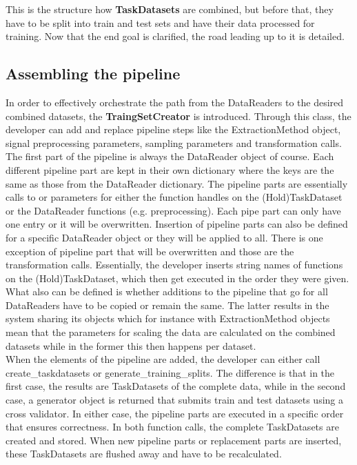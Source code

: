 This is the structure how \textbf{TaskDatasets} are combined, but before that, they have to be split into train and test sets and have their data processed for training. Now that the end goal is clarified, the road leading up to it is detailed. \\

\subsection{Assembling the pipeline} \label{Impl:DataLoad:Assembling}

In order to effectively orchestrate the path from the DataReaders to the desired combined datasets, the \textbf{TraingSetCreator} is introduced. Through this class, the developer can add and replace pipeline steps like the ExtractionMethod object, signal preprocessing parameters, sampling parameters and transformation calls. The first part of the pipeline is always the DataReader object of course. Each different pipeline part are kept in their own dictionary where the keys are the same as those from the DataReader dictionary. The pipeline parts are essentially calls to or parameters for either the function handles on the (Hold)TaskDataset or the DataReader functions (e.g. preprocessing). Each pipe part can only have one entry or it will be overwritten. Insertion of pipeline parts can also be defined for a specific DataReader object or they will be applied to all. There is one exception of pipeline part that will be overwritten and those are the transformation calls. Essentially, the developer inserts string names of functions on the (Hold)TaskDataset, which then get executed in the order they were given. What also can be defined is whether additions to the pipeline that go for all DataReaders have to be copied or remain the same. The latter results in the system sharing its objects which for instance with ExtractionMethod objects mean that the parameters for scaling the data are calculated on the combined datasets while in the former this then happens per dataset.\\

When the elements of the pipeline are added, the developer can either call create\_taskdatasets or generate\_training\_splits. The difference is that in the first case, the results are TaskDatasets of the complete data, while in the second case, a generator object is returned that submits train and test datasets using a cross validator. In either case, the pipeline parts are executed in a specific order that ensures correctness. In both function calls, the complete TaskDatasets are created and stored. When new pipeline parts or replacement parts are inserted, these TaskDatasets are flushed away and have to be recalculated. \\

